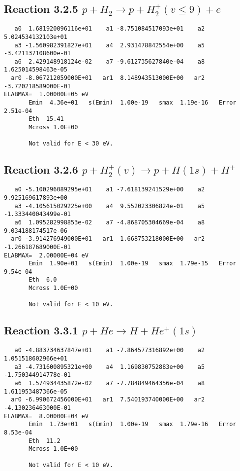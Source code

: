 \documentclass[12pt,dvipdfm]{article}
\begin{document}
\newpage
\subsection{
Reaction 3.2.5 $   p + H_2 \rightarrow p + H_2^+(v \leq 9) + e$}


\begin{small}\begin{verbatim}
   a0  1.681920096116e+01    a1 -8.751084517093e+01    a2  5.024534132103e+01
   a3 -1.560982391827e+01    a4  2.931478842554e+00    a5 -3.421137108600e-01
   a6  2.429148918124e-02    a7 -9.612735627840e-04    a8  1.625014598463e-05
  ar0 -8.067212059000E+01   ar1  8.148943513000E+00   ar2 -3.720218589000E-01
ELABMAX=  1.00000E+05 eV
       Emin  4.36e+01   s(Emin)  1.00e-19   smax  1.19e-16   Error  2.51e-04
       Eth  15.41
       Mcross 1.0E+00

       Not valid for E < 30 eV.
\end{verbatim}\end{small}







\newpage
\subsection{
Reaction 3.2.6 $   p + H_2^+(v) \rightarrow p + H(1s) + H^+$}


\begin{small}\begin{verbatim}
   a0 -5.100296089295e+01    a1 -7.618139241529e+00    a2  9.925169617893e+00
   a3 -4.105615029225e+00    a4  9.552023306824e-01    a5 -1.333440043499e-01
   a6  1.095282998853e-02    a7 -4.868705304669e-04    a8  9.034188174517e-06
  ar0 -3.914276949000E+01   ar1  1.668753218000E+00   ar2 -1.266187689000E-01
ELABMAX=  2.00000E+04 eV
       Emin  1.90e+01   s(Emin)  1.00e-19   smax  1.79e-15   Error  9.54e-04
       Eth  6.0
       Mcross 1.0E+00

       Not valid for E < 10 eV.
\end{verbatim}\end{small}

\newpage
\subsection{
Reaction 3.3.1 $   p + He \rightarrow  H + He^+(1s)$}


\begin{small}\begin{verbatim}
   a0 -4.883734637847e+01    a1 -7.864577316892e+00    a2  1.051518602966e+01
   a3 -4.731600895321e+00    a4  1.169830752883e+00    a5 -1.750344914778e-01
   a6  1.574934435872e-02    a7 -7.784849464356e-04    a8  1.611953487366e-05
  ar0 -6.990672456000E+01   ar1  7.540193740000E+00   ar2 -4.130236463000E-01
ELABMAX=  8.00000E+04 eV
       Emin  1.73e+01   s(Emin)  1.00e-19   smax  1.79e-16   Error  8.53e-04
       Eth  11.2
       Mcross 1.0E+00

       Not valid for E < 10 eV.
\end{verbatim}\end{small}
\end{document}
